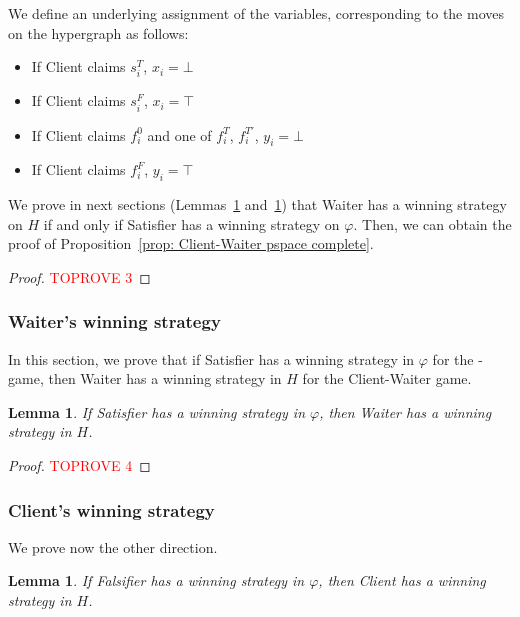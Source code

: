 \documentclass{article}
\newcommand{\PS}{\lang{Paired~SAT}\xspace}
\newcommand{\hyp}{H}
\newtheorem{lemma}[theorem]{Lemma}
\begin{document}
We define an underlying assignment of the variables, corresponding to the moves on the hypergraph as follows:
\begin{itemize}[noitemsep]
    \item If Client claims $s_i^T$, $x_i = \bot$
    \item If Client claims $s_i^F$, $x_i = \top$
    \item If Client claims $f_i^0$ and one of $f_i^T$, $f_i^{T'}$, $y_i = \bot$
    \item If Client claims $f_i^F$, $y_i = \top$
\end{itemize}


We prove in next sections (Lemmas~\ref{falsifier implies client} and~\ref{falsifier implies client}) that Waiter has a winning strategy on \(\hyp\) if and only if Satisfier has a winning strategy on \(\varphi\). Then, we can obtain the proof of Proposition~\ref{prop: Client-Waiter pspace complete}.

\begin{proof}\textcolor{red}{TOPROVE 3}\end{proof}


\subsubsection{Waiter's winning strategy} \label{subsection waiter}

In this section, we prove that if Satisfier has a winning strategy in $\varphi$ for the \PS-game, then Waiter has a winning strategy in $\hyp$ for the Client-Waiter game. 

\begin{lemma}\label{Satisfier implies waiter}
    If Satisfier has a winning strategy in $\varphi$, then Waiter has a winning strategy in $\hyp$. 
\end{lemma}

\begin{proof}\textcolor{red}{TOPROVE 4}\end{proof}

\subsubsection{Client's winning strategy} \label{subsection client}

We prove now the other direction.

\begin{lemma}\label{falsifier implies client}
If Falsifier has a winning strategy in $\varphi$, then Client has a winning strategy in $\hyp$.
\end{lemma}
\end{document}
